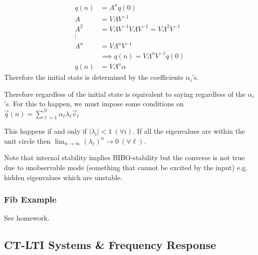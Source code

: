 \begin{align*}
    q(n) &= A^n q(0)
    \\
    A &= V\Lambda V^{-1}
    \\
    A^2
    &= V\Lambda V^{-1}V\Lambda V^{-1} = V\Lambda^2 V^{-1}
    \\
    \vdots
    \\
    A^n 
    &= V\Lambda^n V^{-1}
    \\
    &\implies
    q(n) = V\Lambda^n V^{-1} q(0)
    \\
    q(n) &= V\Lambda^n \alpha
\end{align*}
Therefore the initial state is determined by the coefficients $\alpha_i$'s.

Therefore regardless of the initial state is equivalent to saying regardless of the $\alpha_i$'s. For this to happen, we must impose some conditions on $\vec q(n)=\sum_{\ell=1}^N \alpha_\ell \lambda_\ell \vec v_\ell$

This happens if and only if $|\lambda_i|<1\ (\forall i)$. If all the eigenvalues are within the unit circle then $\displaystyle \lim_{n\to\infty} (\lambda_\ell)^n \to 0\ (\forall \ell)$.

Note that internal stability implies BIBO-stability but the converse is not true due to unobservable mode (something that cannot be excited by the input) e.g. hidden eigenvalues which are unstable.

\subsubsection{Fib Example}
See homework.

\subsection{CT-LTI Systems \& Frequency Response}
